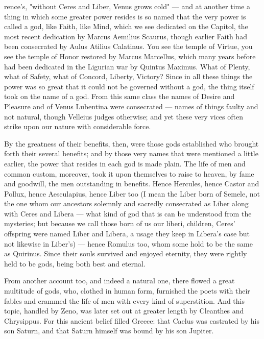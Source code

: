  rence's, "without Ceres and Liber, Venus grows cold" — and at another time a thing in which some greater power resides is so named that the very power is called a god, like Faith, like Mind, which we see dedicated on the Capitol, the most recent dedication by Marcus Aemilius Scaurus, though earlier Faith had been consecrated by Aulus Atilius Calatinus. You see the temple of Virtue, you see the temple of Honor restored by Marcus Marcellus, which many years before had been dedicated in the Ligurian war by Quintus Maximus. What of Plenty, what of Safety, what of Concord, Liberty, Victory? Since in all these things the power was so great that it could not be governed without a god, the thing itself took on the name of a god. From this same class the names of Desire and Pleasure and of Venus Lubentina were consecrated — names of things faulty and not natural, though Velleius judges otherwise; and yet these very vices often strike upon our nature with considerable force.

 By the greatness of their benefits, then, were those gods established who brought forth their several benefits; and by those very names that were mentioned a little earlier, the power that resides in each god is made plain. The life of men and common custom, moreover, took it upon themselves to raise to heaven, by fame and goodwill, the men outstanding in benefits. Hence Hercules, hence Castor and Pollux, hence Aesculapius, hence Liber too (I mean the Liber born of Semele, not the one whom our ancestors solemnly and sacredly consecrated as Liber along with Ceres and Libera — what kind of god that is can be understood from the mysteries; but because we call those born of us our liberi, children, Ceres' offspring were named Liber and Libera, a usage they keep in Libera's case but not likewise in Liber's) — hence Romulus too, whom some hold to be the same as Quirinus. Since their souls survived and enjoyed eternity, they were rightly held to be gods, being both best and eternal.

 From another account too, and indeed a natural one, there flowed a great multitude of gods, who, clothed in human form, furnished the poets with their fables and crammed the life of men with every kind of superstition. And this topic, handled by Zeno, was later set out at greater length by Cleanthes and Chrysippus. For this ancient belief filled Greece: that Caelus was castrated by his son Saturn, and that Saturn himself was bound by his son Jupiter.

